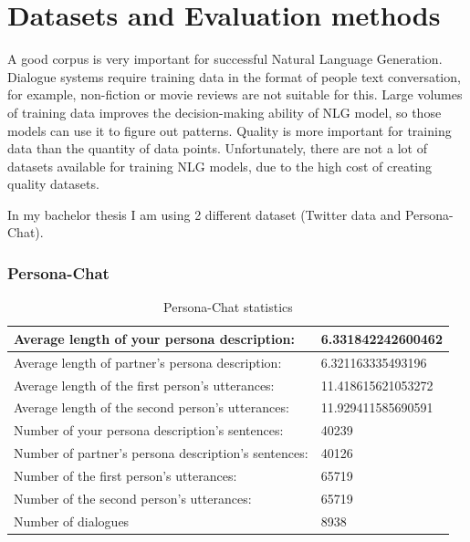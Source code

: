 \chapter{Datasets and Evaluation methods}
A good corpus is very important for successful Natural Language Generation. Dialogue systems require training data in the format of people text conversation, for example, non-fiction or movie reviews are not suitable for this. Large volumes of training data improves the decision-making ability of NLG model, so those models can use it to figure out patterns. Quality is more important for training data than the quantity of data points. Unfortunately, there are not a lot of datasets available for training NLG models, due to the high cost of creating quality datasets. 

In my bachelor thesis I am using 2 different dataset (Twitter data and Persona-Chat). 

\subsection{Persona-Chat}
\begin{table}[t]
\centering
  \begin{tabular}{|p{8cm}|p{4cm}|} 
  \hline
  Average length of  your persona description: & 6.331842242600462 \\
  \hline
  Average length of partner's persona description: & 6.321163335493196 \\
  \hline
  Average length of the first person's utterances: & 11.418615621053272 \\
  \hline
  Average length of the second person's utterances: & 11.929411585690591 \\
  \hline
  Number of your persona description's sentences: & 40239 \\
  \hline
  Number of partner's  persona description's sentences: & 40126 \\
  \hline
  Number of the first person's utterances: & 65719 \\
  \hline
  Number of the second person's utterances:  & 65719 \\
  \hline
  Number of dialogues & 8938 \\
  \hline
  \end{tabular}
  \caption{Persona-Chat statistics}
\label{tab:persona_chat}
\end{table}

